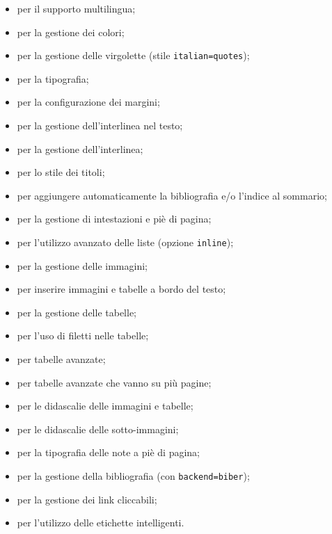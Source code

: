 \begin{itemize}
    \item {} per il supporto multilingua;
    \item {} per la gestione dei colori;
    \item {} per la gestione delle virgolette (stile \texttt{italian=quotes});
    \item {} per la tipografia;
    \item {} per la configurazione dei margini;
    \item {} per la gestione dell'interlinea nel testo;
    \item {} per la gestione dell'interlinea;
    \item {} per lo stile dei titoli;
    \item {} per aggiungere automaticamente la bibliografia e/o l'indice al sommario;
    \item {} per la gestione di intestazioni e piè di pagina;
    \item {} per l'utilizzo avanzato delle liste (opzione \texttt{inline});
    \item {} per la gestione delle immagini;
    \item {} per inserire immagini e tabelle a bordo del testo;
    \item {} per la gestione delle tabelle;
    \item {} per l'uso di filetti nelle tabelle;
    \item {} per tabelle avanzate;
    \item {} per tabelle avanzate che vanno su più pagine;
    \item {} per le didascalie delle immagini e tabelle;
    \item {} per le didascalie delle sotto-immagini;
    \item {} per la tipografia delle note a piè di pagina;
    \item {} per la gestione della bibliografia (con \texttt{backend=biber});
    \item {} per la gestione dei link cliccabili;
    \item {} per l'utilizzo delle etichette intelligenti.
\end{itemize}

